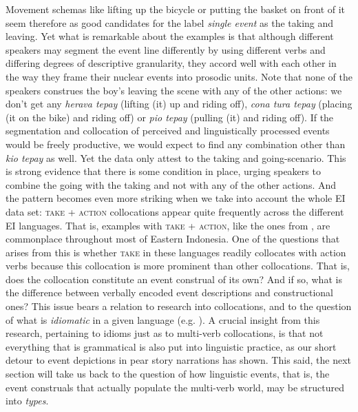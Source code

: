 \largerpage[-1]
Movement schemas like lifting up the bicycle or putting the basket on front of it seem therefore as good candidates for the label \textit{single event} as the taking and leaving. Yet what is remarkable about the  examples is that although different speakers may segment the event line differently by using different verbs and differing degrees of descriptive granularity, they accord well with each other in the way they frame their nuclear events into prosodic units. Note that none of the speakers construes the boy's leaving the scene with any of the other actions: we don't get any \textit{herava tepay} (lifting (it) up and riding off), \textit{cona tura tepay} (placing (it on the bike) and riding off) or \textit{pio tepay} (pulling (it) and riding off). If the segmentation and collocation of perceived and linguistically processed events would be freely productive, we would expect to find any combination other than \textit{kio tepay} as well. Yet the data only attest to the taking and going-scenario. This is strong evidence that there is some condition in place, urging  speakers to combine the going with the taking and not with any of the other actions. And the pattern becomes even more striking when we take into account the whole EI data set: \textsc{take} + \textsc{action} collocations appear quite frequently across the different EI languages. That is, examples with \textsc{take} + \textsc{action}, like the ones from , are commonplace throughout most of Eastern Indonesia. One of the questions that arises from this is whether \textsc{take} in these languages readily collocates with action verbs because this collocation is more prominent than other collocations. That is, does the collocation constitute an event construal of its own? And if so, what is the difference between verbally encoded event descriptions and constructional ones? This issue  bears a relation to research into collocations, and to the question of what is \emph{idiomatic} in a given language (e.g. \citealt{fillmore1988regularity, kay1999grammatical}). A crucial insight from this research, pertaining to idioms just as to multi-verb collocations, is that not everything that is grammatical is also put into linguistic practice, as our short detour to  event depictions in pear story narrations has shown. This said, the next section will take us back to the question of how linguistic events, that is, the event construals that actually populate the multi-verb world, may be structured into \emph{types}.

